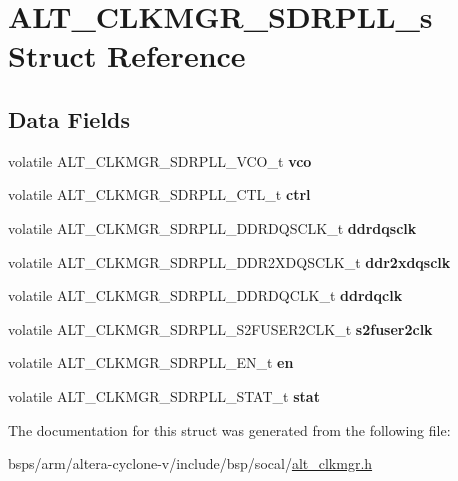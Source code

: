 \hypertarget{structALT__CLKMGR__SDRPLL__s}{}\section{A\+L\+T\+\_\+\+C\+L\+K\+M\+G\+R\+\_\+\+S\+D\+R\+P\+L\+L\+\_\+s Struct Reference}
\label{structALT__CLKMGR__SDRPLL__s}
\subsection*{Data Fields}
\begin{DoxyCompactItemize}
\item 
\mbox{\label{structALT__CLKMGR__SDRPLL__s_a7fb748ae0435ac07fa1a2138a9210dba}} 
volatile A\+L\+T\+\_\+\+C\+L\+K\+M\+G\+R\+\_\+\+S\+D\+R\+P\+L\+L\+\_\+\+V\+C\+O\+\_\+t {\bfseries vco}
\item 
\mbox{\label{structALT__CLKMGR__SDRPLL__s_a398a2e28f985e69f34775625227fddd6}} 
volatile A\+L\+T\+\_\+\+C\+L\+K\+M\+G\+R\+\_\+\+S\+D\+R\+P\+L\+L\+\_\+\+C\+T\+L\+\_\+t {\bfseries ctrl}
\item 
\mbox{\label{structALT__CLKMGR__SDRPLL__s_a030041dfaf2c9157167832f561152ba6}} 
volatile A\+L\+T\+\_\+\+C\+L\+K\+M\+G\+R\+\_\+\+S\+D\+R\+P\+L\+L\+\_\+\+D\+D\+R\+D\+Q\+S\+C\+L\+K\+\_\+t {\bfseries ddrdqsclk}
\item 
\mbox{\label{structALT__CLKMGR__SDRPLL__s_a59279a779061ee4640ac039084c464e5}} 
volatile A\+L\+T\+\_\+\+C\+L\+K\+M\+G\+R\+\_\+\+S\+D\+R\+P\+L\+L\+\_\+\+D\+D\+R2\+X\+D\+Q\+S\+C\+L\+K\+\_\+t {\bfseries ddr2xdqsclk}
\item 
\mbox{\label{structALT__CLKMGR__SDRPLL__s_af01a71dffe375446a9a548305cca3c3a}} 
volatile A\+L\+T\+\_\+\+C\+L\+K\+M\+G\+R\+\_\+\+S\+D\+R\+P\+L\+L\+\_\+\+D\+D\+R\+D\+Q\+C\+L\+K\+\_\+t {\bfseries ddrdqclk}
\item 
\mbox{\label{structALT__CLKMGR__SDRPLL__s_a34489298ef8b7eac8ccbafa8228b69c9}} 
volatile A\+L\+T\+\_\+\+C\+L\+K\+M\+G\+R\+\_\+\+S\+D\+R\+P\+L\+L\+\_\+\+S2\+F\+U\+S\+E\+R2\+C\+L\+K\+\_\+t {\bfseries s2fuser2clk}
\item 
\mbox{\label{structALT__CLKMGR__SDRPLL__s_a9309ac4b489fddd4cc24358728e46194}} 
volatile A\+L\+T\+\_\+\+C\+L\+K\+M\+G\+R\+\_\+\+S\+D\+R\+P\+L\+L\+\_\+\+E\+N\+\_\+t {\bfseries en}
\item 
\mbox{\label{structALT__CLKMGR__SDRPLL__s_a4f4542c38c5de1c1ace3de7b8dfbc22c}} 
volatile A\+L\+T\+\_\+\+C\+L\+K\+M\+G\+R\+\_\+\+S\+D\+R\+P\+L\+L\+\_\+\+S\+T\+A\+T\+\_\+t {\bfseries stat}
\end{DoxyCompactItemize}


The documentation for this struct was generated from the following file\+:\begin{DoxyCompactItemize}
\item 
bsps/arm/altera-\/cyclone-\/v/include/bsp/socal/\mbox{\hyperlink{alt__clkmgr_8h}{alt\+\_\+clkmgr.\+h}}\end{DoxyCompactItemize}
